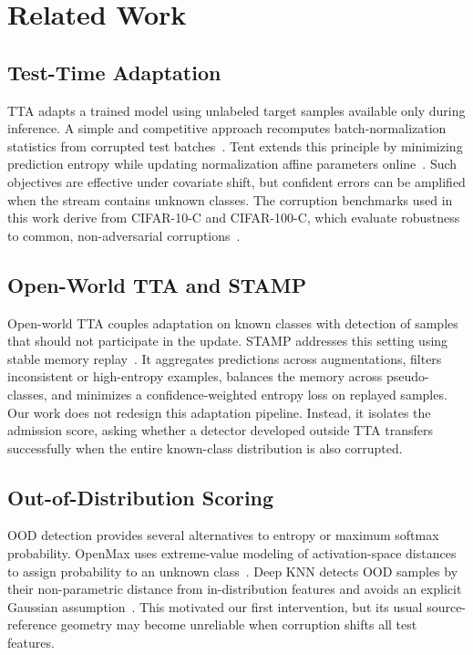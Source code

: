 \section{Related Work}

\subsection{Test-Time Adaptation}
TTA adapts a trained model using unlabeled target samples available only during
inference. A simple and competitive approach recomputes batch-normalization
statistics from corrupted test batches~\cite{schneider2020corruptions}.
Tent extends this principle by minimizing prediction entropy while updating
normalization affine parameters online~\cite{wang2021tent}. Such objectives are
effective under covariate shift, but confident errors can be amplified when the
stream contains unknown classes. The corruption benchmarks used in this work
derive from CIFAR-10-C and CIFAR-100-C, which evaluate robustness to common,
non-adversarial corruptions~\cite{hendrycks2019benchmark}.

\subsection{Open-World TTA and STAMP}
Open-world TTA couples adaptation on known classes with detection of samples
that should not participate in the update. STAMP addresses this setting using
stable memory replay~\cite{yu2024stamp}. It aggregates predictions across
augmentations, filters inconsistent or high-entropy examples, balances the
memory across pseudo-classes, and minimizes a confidence-weighted entropy loss
on replayed samples. Our work does not redesign this adaptation pipeline.
Instead, it isolates the admission score, asking whether a detector developed
outside TTA transfers successfully when the entire known-class distribution is
also corrupted.

\subsection{Out-of-Distribution Scoring}
OOD detection provides several alternatives to entropy or maximum softmax
probability. OpenMax uses extreme-value modeling of activation-space distances
to assign probability to an unknown class~\cite{bendale2016openmax}. Deep KNN
detects OOD samples by their non-parametric distance from in-distribution
features and avoids an explicit Gaussian assumption~\cite{sun2022knn}. This
motivated our first intervention, but its usual source-reference geometry may
become unreliable when corruption shifts all test features.

